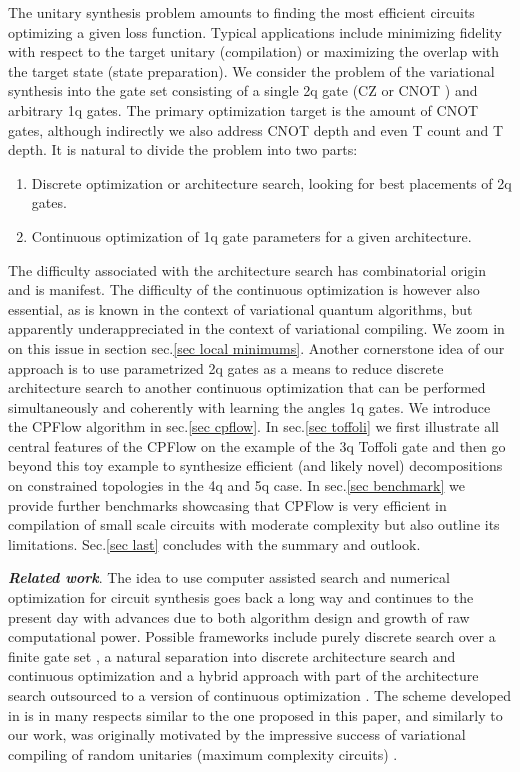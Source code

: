 \documentclass[amsfonts, amssymb, aps, nofootinbib, twocolumn]{revtex4-2}
\newcommand{\CZ}{CZ }
\newcommand{\CX}{CNOT }
\newcommand{\T}{T }
\newcommand{\package}[1]{\textrm {#1 }}
\newcommand{\cpflow}{\package{CPFlow}}
\begin{document}
The unitary synthesis problem amounts to finding the most efficient circuits optimizing a given loss function. Typical applications include minimizing fidelity with respect to the target unitary (compilation) or maximizing the overlap with the target state (state preparation). We consider the problem of the variational synthesis into the gate set consisting of a single 2q gate (\CZ or \CX) and arbitrary 1q gates. The primary optimization target is the amount of \CX gates, although indirectly we also address \CX depth and even \T count and \T depth. It is natural to divide the problem into two parts:
\begin{enumerate}[label=(\roman*), nosep]
	\item Discrete optimization or architecture search, looking for best placements of 2q gates.
	\item Continuous optimization of 1q gate parameters for a given architecture.
\end{enumerate}
The difficulty associated with the architecture search has combinatorial origin and is manifest. The difficulty of the continuous optimization is however also essential, as is known in the context of variational quantum algorithms, but apparently underappreciated in the context of variational compiling. We zoom in on this issue in section sec.\ref{sec local minimums}. Another cornerstone idea of our approach is to use parametrized 2q gates as a means to reduce discrete architecture search to another continuous optimization that can be performed simultaneously and coherently with learning the angles 1q gates. We introduce the \cpflow algorithm in sec.\ref{sec cpflow}. In sec.\ref{sec toffoli} we first illustrate all central features of the \cpflow on the example of the 3q Toffoli gate and then go beyond this toy example to synthesize efficient (and likely novel) decompositions on constrained topologies in the 4q and 5q case. In sec.\ref{sec benchmark} we provide further benchmarks showcasing that \cpflow is very efficient in compilation of small scale circuits with moderate complexity but also outline its limitations. Sec.\ref{sec last} concludes with the summary and outlook.

\textbf{\textit{Related work}}. The idea to use computer assisted search and numerical optimization for circuit synthesis goes back a long way \cite{Divincenzo1994} and continues to the present day with advances due to both algorithm design and growth of raw computational power. Possible frameworks include purely discrete search over a finite gate set \cite{Nagarajan2021}, a natural separation into discrete architecture search and continuous optimization \cite{Nam2018, Khatri2019, Smith2021} and a hybrid approach with part of the architecture search outsourced to a version of continuous optimization \cite{Younis2021, Rakyta2022}. The scheme developed in \cite{Rakyta2022} is in many respects similar to the one proposed in this paper, and similarly to our work, was originally motivated by the impressive success of variational compiling of random unitaries (maximum complexity circuits) \cite{Kiani2020, Madden2021, Rakyta2021}. 
\end{document}
